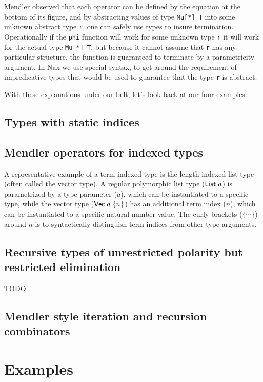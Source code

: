 Mendler observed that each operator can be defined
by the equation at the bottom of its figure, and by abstracting
values of type  \verb+Mu[*] T+ into some unknown abstract type \verb+r+, one can safely use
types to insure termination.  Operationally
if the \verb+phi+ function will work for some unknown type \verb+r+
it will work for the actual type \verb+Mu[*] T+, but because it cannot
assume that \verb+r+ has any particular structure, the function is
guaranteed to terminate by a parametricity argument. In Nax we use special
syntax, to get around the requirement of impredicative types that would be used
to guarantee that the type \verb+r+ is abstract.

With these explanations under our belt, let's look back at our four examples.


  
\subsection{Types with static indices}\label{sec:bg:ixty}


\subsection{Mendler operators for indexed types}

A representative example of a term
indexed type is the length indexed list type (often called the vector type).
A regular polymorphic list type ($\mathsf{List}\;a$) is parametrized by a type
parameter ($a$), which can be instantiated to a specific type, while the
vector type ($\mathsf{Vec}\;a\;\{n\}$) has an additional term index ($n$), which
can be instantiated to a specific natural number value. The curly brackets
($\{\cdots\}$) around $n$ is to syntactically distinguish term indices from
other type arguments. 

\subsection{Recursive types of unrestricted polarity but restricted elimination}
\label{sec:bg:recty}
TODO

\subsection{Mendler style iteration and recursion combinators}
\label{sec:bg:Mendler}


\section{Examples}\label{sec:examples}

